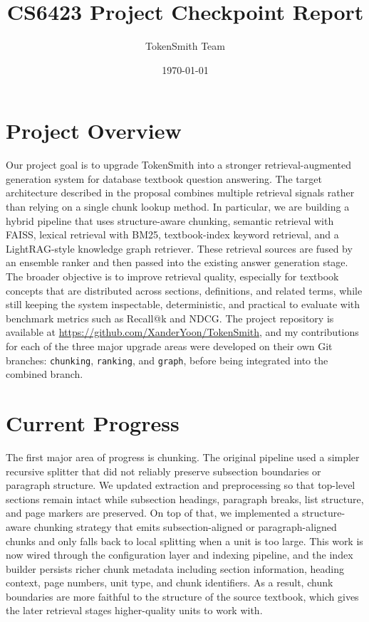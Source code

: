 \documentclass[11pt]{article}
\title{CS6423 Project Checkpoint Report}
\author{TokenSmith Team}
\date{\today}
\begin{document}
\maketitle

\section*{Project Overview}
Our project goal is to upgrade TokenSmith into a stronger retrieval-augmented generation system for database textbook question answering. The target architecture described in the proposal combines multiple retrieval signals rather than relying on a single chunk lookup method. In particular, we are building a hybrid pipeline that uses structure-aware chunking, semantic retrieval with FAISS, lexical retrieval with BM25, textbook-index keyword retrieval, and a LightRAG-style knowledge graph retriever. These retrieval sources are fused by an ensemble ranker and then passed into the existing answer generation stage. The broader objective is to improve retrieval quality, especially for textbook concepts that are distributed across sections, definitions, and related terms, while still keeping the system inspectable, deterministic, and practical to evaluate with benchmark metrics such as Recall@k and NDCG. The project repository is available at \url{https://github.com/XanderYoon/TokenSmith}, and my contributions for each of the three major upgrade areas were developed on their own Git branches: \texttt{chunking}, \texttt{ranking}, and \texttt{graph}, before being integrated into the combined branch.

\section*{Current Progress}
The first major area of progress is chunking. The original pipeline used a simpler recursive splitter that did not reliably preserve subsection boundaries or paragraph structure. We updated extraction and preprocessing so that top-level sections remain intact while subsection headings, paragraph breaks, list structure, and page markers are preserved. On top of that, we implemented a structure-aware chunking strategy that emits subsection-aligned or paragraph-aligned chunks and only falls back to local splitting when a unit is too large. This work is now wired through the configuration layer and indexing pipeline, and the index builder persists richer chunk metadata including section information, heading context, page numbers, unit type, and chunk identifiers. As a result, chunk boundaries are more faithful to the structure of the source textbook, which gives the later retrieval stages higher-quality units to work with.
\end{document}
